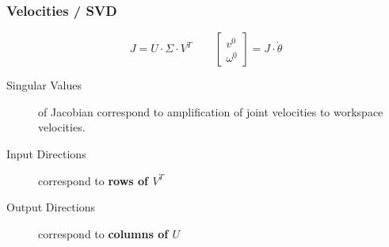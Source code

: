     \subsubsection{Velocities / SVD}
        $$
            J = U \cdot \Sigma \cdot V^T 
            \qquad
            \begin{bmatrix}
                v^0 \\ \omega^0
            \end{bmatrix}
            =
            J \cdot \dot{\theta}                
        $$
        \begin{description}
            \item[Singular Values] of Jacobian correspond to amplification of joint velocities to workspace velocities.
            \item[Input Directions] correspond to \textbf{rows of $V^T$}
            \item[Output Directions] correspond to \textbf{columns of $U$}
        \end{description}